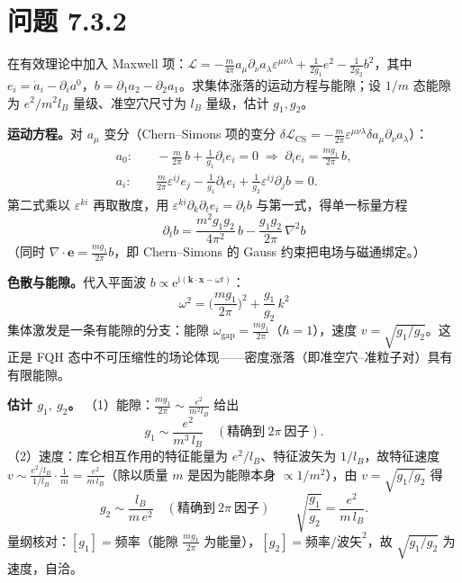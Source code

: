 \section*{问题 7.3.2}
\begin{problem}
在有效理论中加入 Maxwell 项：$\mathcal{L}=-\frac{m}{4\pi}a_\mu\partial_\nu a_\lambda\varepsilon^{\mu\nu\lambda}+\frac{1}{2g_1}e^2-\frac{1}{2g_2}b^2$，其中 $e_i=\dot{a}_i-\partial_ia^0$，$b=\partial_1a_2-\partial_2a_1$。求集体涨落的运动方程与能隙；设 $1/m$ 态能隙为 $e^2/m^2l_B$ 量级、准空穴尺寸为 $l_B$ 量级，估计 $g_1,g_2$。
\end{problem}
\solution
\textbf{运动方程。}对 $a_\mu$ 变分（Chern--Simons 项的变分 $\delta\mathcal{L}_{\text{CS}}=-\frac{m}{2\pi}\varepsilon^{\mu\nu\lambda}\delta a_\mu\partial_\nu a_\lambda$）：
\begin{align*}
a_0:&\quad -\frac{m}{2\pi}\,b+\frac{1}{g_1}\partial_ie_i=0
\;\Longrightarrow\;
\partial_ie_i=\frac{mg_1}{2\pi}\,b,\\
a_i:&\quad \frac{m}{2\pi}\varepsilon^{ij}e_j-\frac{1}{g_1}\partial_te_i+\frac{1}{g_2}\varepsilon^{ij}\partial_jb=0 .
\end{align*}
第二式乘以 $\varepsilon^{ki}$ 再取散度，用 $\varepsilon^{ki}\partial_k\partial_te_i=\partial_tb$ 与第一式，得单一标量方程
\begin{equation*}
\boxed{\;\partial_tb=\frac{m^2g_1g_2}{4\pi^2}\,b-\frac{g_1g_2}{2\pi}\,\nabla^2 b\;}
\end{equation*}
（同时 $\nabla\cdot\pmb{e}=\frac{mg_1}{2\pi}b$，即 Chern--Simons 的 Gauss 约束把电场与磁通绑定。）

\textbf{色散与能隙。}代入平面波 $b\propto\mathrm{e}^{\mathrm{i}(\pmb{k}\cdot\pmb{x}-\omega t)}$：
\begin{equation*}
\boxed{\;\omega^2=\Big(\frac{mg_1}{2\pi}\Big)^{2}+\frac{g_1}{g_2}\,k^2\;}
\end{equation*}
集体激发是一条有能隙的分支：能隙 $\omega_{\text{gap}}=\frac{mg_1}{2\pi}$（$\hbar=1$），速度 $v=\sqrt{g_1/g_2}$。这正是 FQH 态中不可压缩性的场论体现——密度涨落（即准空穴--准粒子对）具有有限能隙。

\textbf{估计 $g_1,\ g_2$。}
（1）能隙：$\frac{mg_1}{2\pi}\sim\frac{e^2}{m^2l_B}$ 给出
\begin{equation*}
g_1\sim\frac{e^2}{m^3\,l_B}\quad(\text{精确到}\ 2\pi\ \text{因子}).
\end{equation*}
（2）速度：库仑相互作用的特征能量为 $e^2/l_B$、特征波矢为 $1/l_B$，故特征速度 $v\sim\frac{e^2/l_B}{1/l_B}\cdot\frac{1}{m}=\frac{e^2}{m\,l_B}$（除以质量 $m$ 是因为能隙本身 $\propto1/m^2$），由 $v=\sqrt{g_1/g_2}$ 得
\begin{equation*}
g_2\sim\frac{l_B}{m\,e^2}\quad(\text{精确到}\ 2\pi\ \text{因子})
\qquad
\sqrt{\frac{g_1}{g_2}}=\frac{e^2}{m\,l_B}.
\end{equation*}
量纲核对：$[g_1]=$频率（能隙 $\frac{mg_1}{2\pi}$ 为能量），$[g_2]=\text{频率}/\text{波矢}^2$，故 $\sqrt{g_1/g_2}$ 为速度，自洽。

